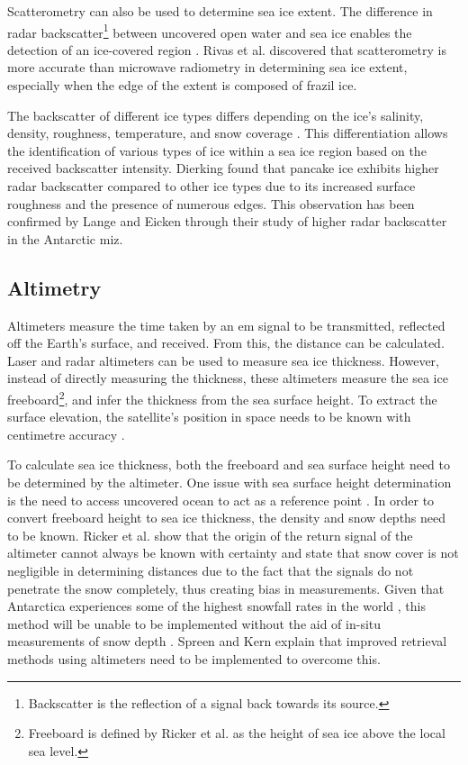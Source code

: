 Scatterometry can also be used to determine sea ice extent. The difference in radar backscatter\footnote{Backscatter is the reflection of a signal back towards its source.} between uncovered open water and sea ice enables the detection of an ice-covered region \cite{Thomas2017Chap9}. Rivas et al. \cite{Rivas2018} discovered that scatterometry is more accurate than microwave radiometry in determining sea ice extent, especially when the edge of the extent is composed of frazil ice.

The backscatter of different ice types differs depending on the ice's salinity, density, roughness, temperature, and snow coverage \cite{Thomas2017Chap9}. This differentiation allows the identification of various types of ice within a sea ice region based on the received backscatter intensity. Dierking \cite{Dierking2001} found that pancake ice exhibits higher radar backscatter compared to other ice types due to its increased surface roughness and the presence of numerous edges. This observation has been confirmed by Lange and Eicken \cite{Lange1991} through their study of higher radar backscatter in the Antarctic \acs{miz}.

\subsection{Altimetry} \label{subsec:litReview.seaIceCharac.altimetry}

Altimeters measure the time taken by an \acs{em} signal to be transmitted, reflected off the Earth's surface, and received. From this, the distance can be calculated. Laser and radar altimeters can be used to measure sea ice thickness. However, instead of directly measuring the thickness, these altimeters measure the sea ice freeboard\footnote{Freeboard is defined by Ricker et al. \cite{Ricker2015} as the height of sea ice above the local sea level.}, and infer the thickness from the sea surface height. To extract the surface elevation, the satellite's position in space needs to be known with centimetre accuracy \cite{Thomas2017Chap9}.

To calculate sea ice thickness, both the freeboard and sea surface height need to be determined by the altimeter. One issue with sea surface height determination is the need to access uncovered ocean to act as a reference point \cite{Thomas2017Chap9}. In order to convert freeboard height to sea ice thickness, the density and snow depths need to be known. Ricker et al. \cite{Ricker2015} show that the origin of the return signal of the altimeter cannot always be known with certainty and state that snow cover is not negligible in determining distances due to the fact that the signals do not penetrate the snow completely, thus creating bias in measurements. Given that Antarctica experiences some of the highest snowfall rates in the world \cite{Maksym2012}, this method will be unable to be implemented without the aid of in-situ measurements of snow depth \cite{Ricker2015}. Spreen and Kern \cite{Thomas2017Chap9} explain that improved retrieval methods using altimeters need to be implemented to overcome this.


